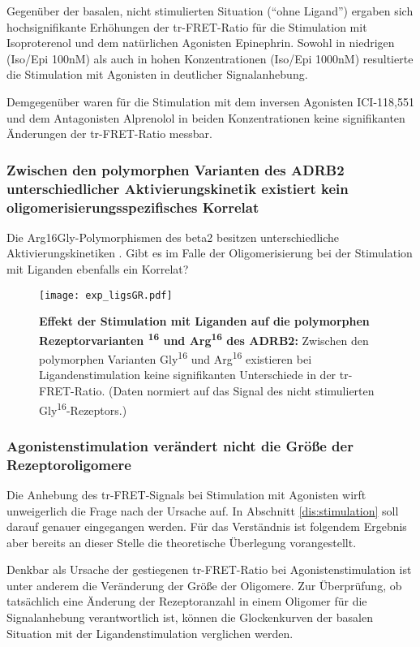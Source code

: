 Gegenüber der basalen, nicht stimulierten Situation ("`ohne Ligand"') ergaben sich hochsignifikante Erhöhungen der tr-FRET-Ratio für die Stimulation mit Isoproterenol und dem natürlichen Agonisten Epinephrin. Sowohl in niedrigen (Iso/Epi 100\si{\nano M}) als auch in hohen Konzentrationen (Iso/Epi 1000\si{\nano M}) resultierte die Stimulation mit Agonisten in deutlicher Signalanhebung. 

Demgegenüber waren für die Stimulation mit dem inversen Agonisten ICI-118,551 und dem Antagonisten Alprenolol in beiden Konzentrationen keine signifikanten Änderungen der tr-FRET-Ratio messbar. 

\subsubsection{Zwischen den polymorphen Varianten des ADRB2 unterschiedlicher Aktivierungskinetik existiert kein oligomerisierungsspezifisches Korrelat}
Die Arg16Gly-Polymorphismen des \gls{beta2} besitzen unterschiedliche Aktivierungskinetiken \parencite{Ahles2011}. Gibt es im Falle der Oligomerisierung bei der Stimulation mit Liganden ebenfalls ein Korrelat? 

\begin{figure}[htbp]
	\centering
    \texttt{[image: exp\_ligsGR.pdf]}
    \caption{\textbf{Effekt der Stimulation mit Liganden auf die polymorphen Rezeptorvarianten \textsuperscript{16} und Arg\textsuperscript{16} des ADRB2:} Zwischen den polymorphen Varianten Gly\textsuperscript{16} und Arg\textsuperscript{16} existieren bei Ligandenstimulation keine signifikanten Unterschiede in der tr-FRET-Ratio. (Daten normiert auf das Signal des nicht stimulierten Gly\textsuperscript{16}-Rezeptors.)} 
    \label{fig:stimulation}
\end{figure}

\subsubsection{Agonistenstimulation verändert nicht die Größe der Rezeptoroligomere}
Die Anhebung des tr-FRET-Signals bei Stimulation mit Agonisten wirft unweigerlich die Frage nach der Ursache auf. In Abschnitt \ref{dis:stimulation} soll darauf genauer eingegangen werden. Für das Verständnis ist folgendem Ergebnis aber bereits an dieser Stelle die theoretische Überlegung vorangestellt.

 Denkbar als Ursache der gestiegenen tr-FRET-Ratio bei Agonistenstimulation ist unter anderem die Veränderung der Größe der Oligomere. Zur Überprüfung, ob tatsächlich eine Änderung der Rezeptoranzahl in einem Oligomer für die Signalanhebung verantwortlich ist, können die Glockenkurven der basalen Situation mit der Ligandenstimulation verglichen werden. 

